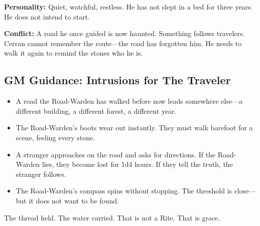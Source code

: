 \textbf{Personality:} Quiet, watchful, restless. He has not slept in a bed for three years. He does not intend to start.

\textbf{Conflict:} A road he once guided is now haunted. Something follows travelers. Cerran cannot remember the route—the road has forgotten him. He needs to walk it again to remind the stones who he is.

\subsection{GM Guidance: Intrusions for The Traveler}

\begin{itemize}
\item A road the Road-Warden has walked before now leads somewhere else—a different building, a different forest, a different year.
\item The Road-Warden's boots wear out instantly. They must walk barefoot for a scene, feeling every stone.
\item A stranger approaches on the road and asks for directions. If the Road-Warden lies, they become lost for 1d4 hours. If they tell the truth, the stranger follows.
\item The Road-Warden's compass spins without stopping. The threshold is close—but it does not want to be found.
\end{itemize}

The thread held. The water carried. That is not a Rite. That is grace.
